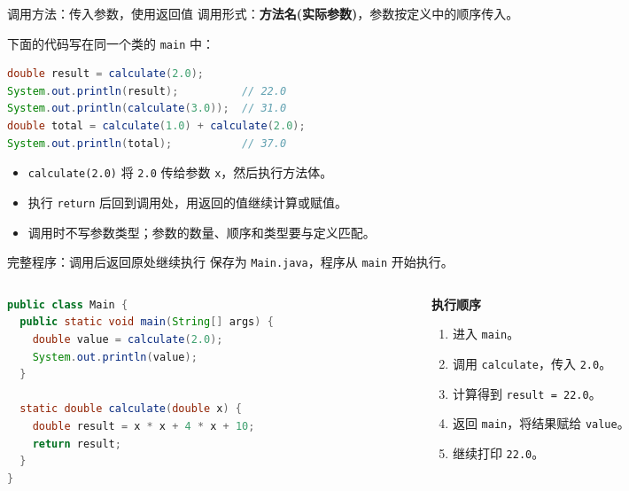 \documentclass[aspectratio=169]{beamer}
\begin{document}
\begin{frame}[fragile]{调用方法：传入参数，使用返回值}
  调用形式：\textbf{方法名(实际参数)}，参数按定义中的顺序传入。
  \par\medskip
  下面的代码写在同一个类的 \texttt{main} 中：
  \begin{lstlisting}[language=Java]
double result = calculate(2.0);
System.out.println(result);          // 22.0
System.out.println(calculate(3.0));  // 31.0
double total = calculate(1.0) + calculate(2.0);
System.out.println(total);           // 37.0
  \end{lstlisting}
  \begin{itemize}
    \item \texttt{calculate(2.0)} 将 \texttt{2.0} 传给参数 \texttt{x}，然后执行方法体。
    \item 执行 \texttt{return} 后回到调用处，用返回的值继续计算或赋值。
    \item 调用时不写参数类型；参数的数量、顺序和类型要与定义匹配。
  \end{itemize}
\end{frame}

\begin{frame}[fragile]{完整程序：调用后返回原处继续执行}
  保存为 \texttt{Main.java}，程序从 \texttt{main} 开始执行。
  \par\medskip
  \begin{columns}[T,onlytextwidth]
    \begin{column}{0.66\textwidth}
      \begin{lstlisting}[language=Java]
public class Main {
  public static void main(String[] args) {
    double value = calculate(2.0);
    System.out.println(value);
  }

  static double calculate(double x) {
    double result = x * x + 4 * x + 10;
    return result;
  }
}
      \end{lstlisting}
    \end{column}
    \begin{column}{0.30\textwidth}
      \textbf{执行顺序}
      \begin{enumerate}
        \item 进入 \texttt{main}。
        \item 调用 \texttt{calculate}，传入 \texttt{2.0}。
        \item 计算得到 \texttt{result = 22.0}。
        \item 返回 \texttt{main}，将结果赋给 \texttt{value}。
        \item 继续打印 \texttt{22.0}。
      \end{enumerate}
    \end{column}
  \end{columns}
\end{frame}
\end{document}

